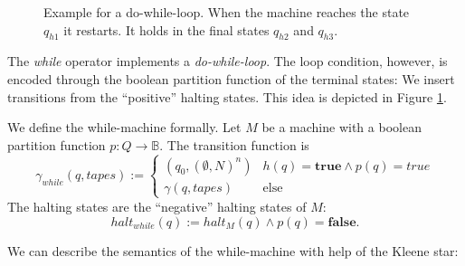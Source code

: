 \documentclass{psartcl}
\newcommand{\from}{:}
\renewcommand{\to}{\rightarrow}
\newcommand{\Bool}{\mathbb{B}}
\renewcommand{\None}{\emptyset}
\newcommand{\true}{\mathbf{true}}
\newcommand{\false}{\mathbf{false}}
\newcommand{\txt}[1]{\text{#1}}
\begin{document}
\begin{figure}
  \center
  \caption{Example for a do-while-loop.  When the machine reaches the state $q_{h1}$ it restarts.  It holds in the final states $q_{h2}$ and $q_{h3}$.}
  \label{fig:while-example}
\end{figure}

The \emph{while} operator implements a \emph{do-while-loop}.  The loop condition, however, is encoded through the boolean partition
function of the terminal states:  We insert transitions from the ``positive'' halting states.  This idea is depicted in Figure
\ref{fig:while-example}.

We define the while-machine formally.  Let $M$ be a machine with a boolean partition function $p \from Q \to \Bool$.  The transition function is
$$\gamma_{while} (q, tapes) :=
  \begin{cases}
    (q_0, (\None, N)^n)   & h(q) = \true \land p(q) = true \\
    \gamma(q, tapes)      & \txt{else}
  \end{cases} $$
The halting states are the ``negative'' halting states of $M$:
$$halt_{while}(q) := halt_M(q) \land p(q) = \false.$$

We can describe the semantics of the while-machine with help of the Kleene star:
\end{document}
